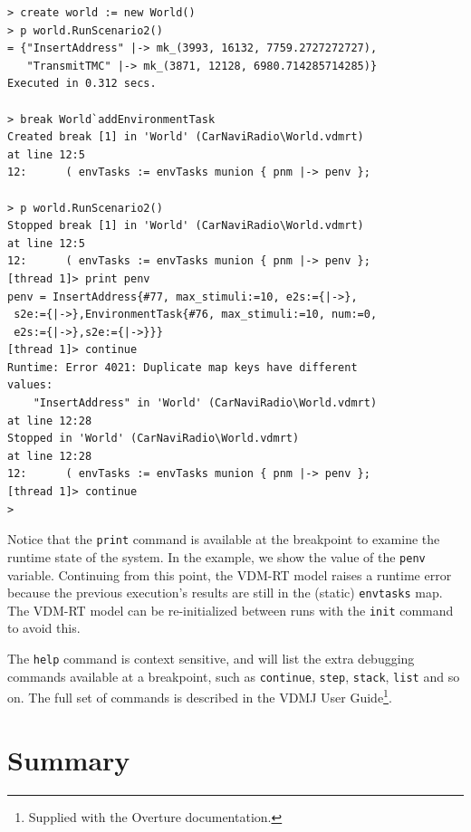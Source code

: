 \begin{lstlisting}
> create world := new World()
> p world.RunScenario2()
= {"InsertAddress" |-> mk_(3993, 16132, 7759.2727272727),
   "TransmitTMC" |-> mk_(3871, 12128, 6980.714285714285)}
Executed in 0.312 secs.

> break World`addEnvironmentTask
Created break [1] in 'World' (CarNaviRadio\World.vdmrt) 
at line 12:5
12:      ( envTasks := envTasks munion { pnm |-> penv };

> p world.RunScenario2()
Stopped break [1] in 'World' (CarNaviRadio\World.vdmrt) 
at line 12:5
12:      ( envTasks := envTasks munion { pnm |-> penv };
[thread 1]> print penv
penv = InsertAddress{#77, max_stimuli:=10, e2s:={|->},
 s2e:={|->},EnvironmentTask{#76, max_stimuli:=10, num:=0,
 e2s:={|->},s2e:={|->}}}
[thread 1]> continue
Runtime: Error 4021: Duplicate map keys have different 
values:
    "InsertAddress" in 'World' (CarNaviRadio\World.vdmrt) 
at line 12:28
Stopped in 'World' (CarNaviRadio\World.vdmrt) 
at line 12:28
12:      ( envTasks := envTasks munion { pnm |-> penv };
[thread 1]> continue
> \end{lstlisting}

\noindent Notice that the \verb|print| command is available at the breakpoint
to examine the runtime state of the system. In the example, we show the value
of the \verb|penv| variable. Continuing from this point, the VDM-RT model
raises a runtime error because the previous execution's results are still in
the (static) \verb|envtasks| map. The VDM-RT model can be re-initialized
between runs with the \verb|init| command to avoid this.

The \verb|help| command is context sensitive, and will list the extra debugging
commands available at a breakpoint, such as \verb|continue|, \verb|step|,
\verb|stack|, \verb|list| and so on. The full set of commands is described in the
VDMJ User Guide\footnote{Supplied with the Overture documentation.}.

\lstset{style=mystyle}

\lstset{style=mystyle,language=VDM++}

\section{Summary}\label{sec:toolintrosummary}

